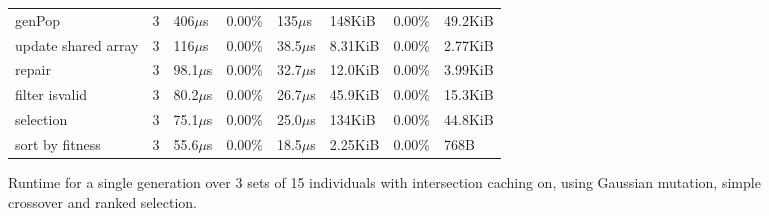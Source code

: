 \begin{appendices}
\begin{figure}
\begin{tabular}{l l l l l l l l}
     \hspace{12pt}genPop                      &   3  &  406\(\mu\)s & 0.00\% &  135\(\mu\)s   & 148KiB  &0.00\%  &49.2KiB\\
     \hspace{12pt}update shared array         &   3  &  116\(\mu\)s & 0.00\% & 38.5\(\mu\)s   &8.31KiB  &0.00\%  &2.77KiB\\
     \hspace{12pt}repair                      &   3  & 98.1\(\mu\)s & 0.00\% & 32.7\(\mu\)s   &12.0KiB  &0.00\%  &3.99KiB\\
     \hspace{12pt}filter isvalid              &   3  & 80.2\(\mu\)s & 0.00\% & 26.7\(\mu\)s   &45.9KiB  &0.00\%  &15.3KiB\\
     \hspace{12pt}selection                   &   3  & 75.1\(\mu\)s & 0.00\% & 25.0\(\mu\)s   & 134KiB  &0.00\%  &44.8KiB\\
     \hspace{12pt}sort by fitness             &   3  & 55.6\(\mu\)s & 0.00\% & 18.5\(\mu\)s   &2.25KiB  &0.00\%  &   768B\\
      \hline
  \end{tabular}
  \caption{\label{app:tab:MARuntime} Runtime for a single generation over 3 sets of 15 individuals with intersection caching on, using Gaussian mutation, simple crossover and ranked selection.}
\end{figure}
\begin{adjustbox}{angle=90}
\end{adjustbox}

\end{appendices}

